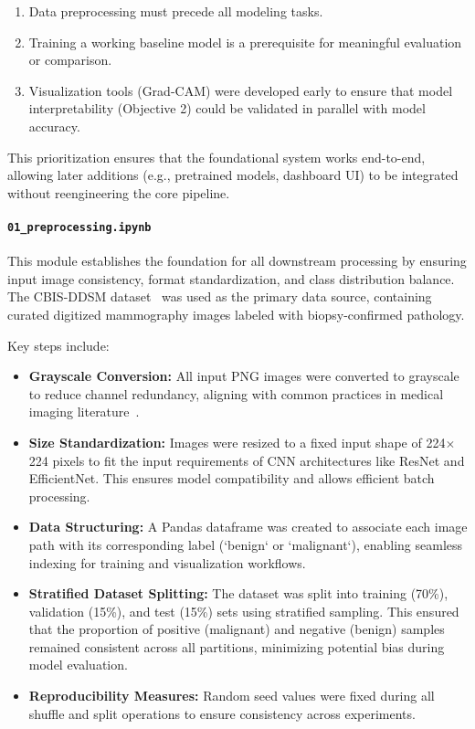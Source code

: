 \documentclass[12pt]{article}
\begin{document}
\begin{enumerate}
    \item Data preprocessing must precede all modeling tasks.
    \item Training a working baseline model is a prerequisite for meaningful evaluation or comparison.
    \item Visualization tools (Grad-CAM) were developed early to ensure that model interpretability (Objective 2) could be validated in parallel with model accuracy.
\end{enumerate}

This prioritization ensures that the foundational system works end-to-end, allowing later additions (e.g., pretrained models, dashboard UI) to be integrated without reengineering the core pipeline.


\paragraph{\texttt{01\_preprocessing.ipynb}}
This module establishes the foundation for all downstream processing by ensuring input image consistency, format standardization, and class distribution balance. The CBIS-DDSM dataset~\cite{18} was used as the primary data source, containing curated digitized mammography images labeled with biopsy-confirmed pathology.

Key steps include:
\begin{itemize}
    \item \textbf{Grayscale Conversion:} All input PNG images were converted to grayscale to reduce channel redundancy, aligning with common practices in medical imaging literature~\cite{7}.
    \item \textbf{Size Standardization:} Images were resized to a fixed input shape of 224$\times$224 pixels to fit the input requirements of CNN architectures like ResNet and EfficientNet. This ensures model compatibility and allows efficient batch processing.
    \item \textbf{Data Structuring:} A Pandas dataframe was created to associate each image path with its corresponding label (`benign` or `malignant`), enabling seamless indexing for training and visualization workflows.
    \item \textbf{Stratified Dataset Splitting:} The dataset was split into training (70\%), validation (15\%), and test (15\%) sets using stratified sampling. This ensured that the proportion of positive (malignant) and negative (benign) samples remained consistent across all partitions, minimizing potential bias during model evaluation.
    \item \textbf{Reproducibility Measures:} Random seed values were fixed during all shuffle and split operations to ensure consistency across experiments.
\end{itemize}
\end{document}
